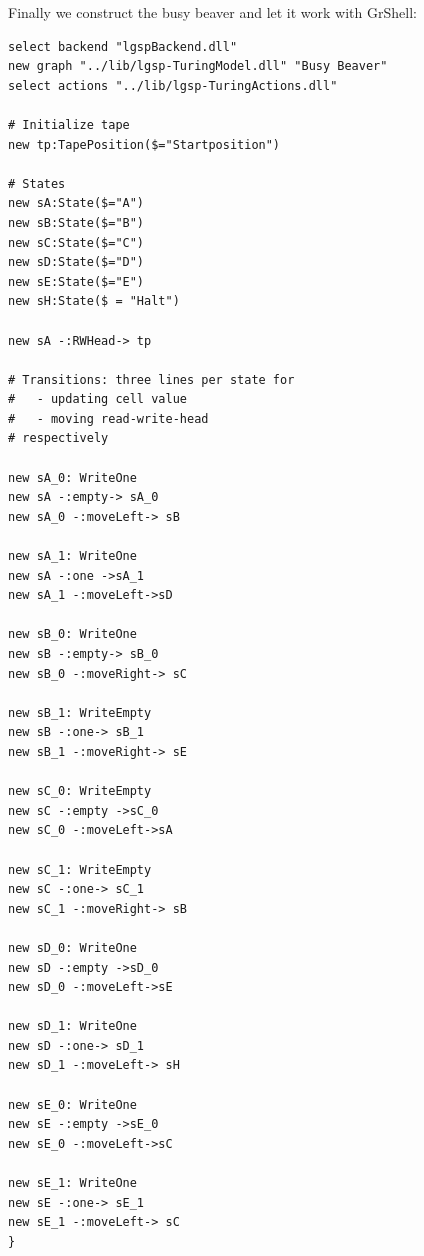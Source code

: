 Finally we construct the busy beaver and let it work with GrShell:
\lstset{language=grshell}
\begin{lstlisting}[name=bb] 
select backend "lgspBackend.dll"
new graph "../lib/lgsp-TuringModel.dll" "Busy Beaver"
select actions "../lib/lgsp-TuringActions.dll"

# Initialize tape
new tp:TapePosition($="Startposition")

# States
new sA:State($="A")
new sB:State($="B")
new sC:State($="C")
new sD:State($="D")
new sE:State($="E")
new sH:State($ = "Halt")

new sA -:RWHead-> tp

# Transitions: three lines per state for
#   - updating cell value
#   - moving read-write-head
# respectively

new sA_0: WriteOne
new sA -:empty-> sA_0
new sA_0 -:moveLeft-> sB

new sA_1: WriteOne
new sA -:one ->sA_1
new sA_1 -:moveLeft->sD

new sB_0: WriteOne
new sB -:empty-> sB_0
new sB_0 -:moveRight-> sC

new sB_1: WriteEmpty
new sB -:one-> sB_1
new sB_1 -:moveRight-> sE

new sC_0: WriteEmpty
new sC -:empty ->sC_0
new sC_0 -:moveLeft->sA

new sC_1: WriteEmpty
new sC -:one-> sC_1
new sC_1 -:moveRight-> sB

new sD_0: WriteOne
new sD -:empty ->sD_0
new sD_0 -:moveLeft->sE

new sD_1: WriteOne
new sD -:one-> sD_1
new sD_1 -:moveLeft-> sH

new sE_0: WriteOne
new sE -:empty ->sE_0
new sE_0 -:moveLeft->sC

new sE_1: WriteOne
new sE -:one-> sE_1
new sE_1 -:moveLeft-> sC
}      
\end{lstlisting}

